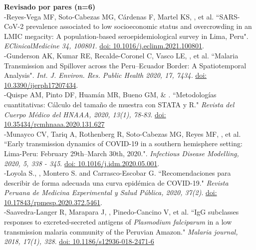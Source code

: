 \documentclass[margin,line]{res}
\begin{document}
\begin{resume}
		{\bf Revisado por pares (n=6)}\\
		-Reyes-Vega MF, Soto-Cabezas MG, Cárdenas F, Martel KS, \underline{}, et al. ``{SARS-CoV-2 prevalence associated to low socioeconomic status and overcrowding in an LMIC megacity: A population-based seroepidemiological survey in Lima, Peru}". \textit{EClinicalMedicine 34, 100801.} \href{https://www.thelancet.com/journals/eclinm/article/PIIS2589-5370(21)00081-X/fulltext}{doi: 10.1016/j.eclinm.2021.100801}.\\
		-Gunderson AK, Kumar RE, Recalde-Coronel C, Vasco LE, \underline{}, et al. ``{Malaria Transmission and Spillover across the Peru–Ecuador Border: A Spatiotemporal Analysis}". \textit{Int. J. Environ. Res. Public Health 2020, 17, 7434.} \href{https://doi.org/10.3390/ijerph17207434}{doi: 10.3390/ijerph17207434}.\\
		-Quispe AM, Pinto DF, Huamán MR, Bueno GM, \& \underline{}. ``Metodologías cuantitativas: Cálculo del tamaño de muestra con STATA y R." \textit{Revista del Cuerpo Médico del HNAAA, 2020, 13(1), 78-83}. \href{https://doi.org/10.35434/rcmhnaaa.2020.131.627}{doi: 10.35434/rcmhnaaa.2020.131.627}\\
		-Munayco CV, Tariq A, Rothenberg R, Soto-Cabezas MG, Reyes MF, \underline{}, et al. ``{Early transmission dynamics of COVID-19 in a southern hemisphere setting: Lima-Peru: February 29th--March 30th, 2020.}". \textit{Infectious Disease Modelling, 2020, 5, 338 - 345}. \href{https://www.sciencedirect.com/science/article/pii/S2468042720300130}{doi: 10.1016/j.idm.2020.05.001}.\\
		-Loyola S., \underline{}, Montero S. and Carrasco-Escobar G. ``Recomendaciones para describir de forma adecuada una curva epidémica de COVID-19." \textit{{Revista Peruana de Medicina Experimental y Salud P{\'u}blica}, 2020, 37(2)}. \href{https://rpmesp.ins.gob.pe/index.php/rpmesp/article/view/5461}{doi: 10.17843/rpmesp.2020.372.5461}.\\
		-Saavedra-Langer R, Marapara J, \underline{}, Pinedo-Cancino V, et al. ``IgG subclasses responses to excreted-secreted antigens of \textit{Plasmodium falciparum} in a low transmission malaria community of the Peruvian Amazon." \textit{Malaria journal, 2018, 17(1), 328}. \href{https://doi.org/10.1186/s12936-018-2471-6}{doi: 10.1186/s12936-018-2471-6}\\[4pt]%

\end{resume}
\end{document}
